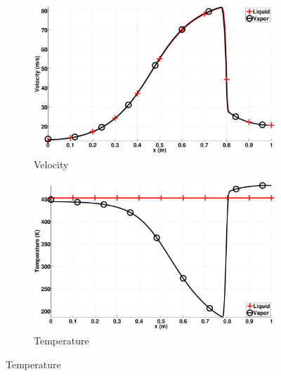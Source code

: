 \documentclass[preprint,10pt]{elsarticle}
\begin{document}
\begin{figure}[H]
        \centering
        \begin{subfigure}[b]{0.495\textwidth}
                \centering
                \includegraphics[width=\textwidth]{figures/nozzle-aint-1e4_two_phases_velocity.eps}
                \caption{Velocity}
                \label{fig:nozzle-aint-1e4-vel}
        \end{subfigure}%
        \begin{subfigure}[b]{0.495\textwidth}
                \centering
                \includegraphics[width=\textwidth]{figures/nozzle-aint-1e4_two_phases_temperature.eps}
                \caption{Temperature}
                \label{fig:nozzle-aint-1e4-density}
        \end{subfigure}
        

\end{figure}
\end{document}
